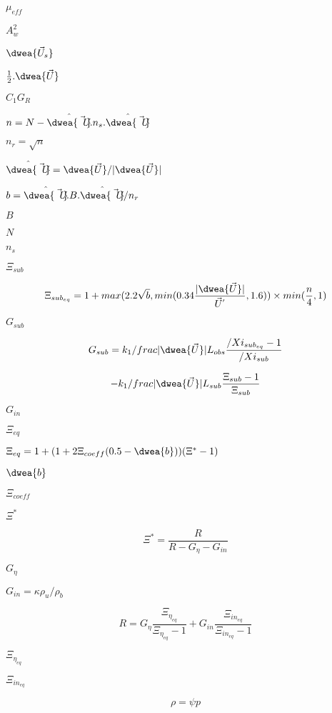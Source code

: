 \documentclass{article}
\begin{document}
$ \mu_{eff} $
\pagebreak

$ A_{w}^{2}$
\pagebreak

$ \dwea{\vec{U}_{s}} $
\pagebreak

$ \frac{1}{2}. \dwea{\vec{U}} $
\pagebreak

$ C_{1} G_{R} $
\pagebreak

$ n = N - \hat{\dwea{\vec{U}}}.n_{s}.\hat{\dwea{\vec{U}}} $
\pagebreak

$ n_{r} = \sqrt{n} $
\pagebreak

$ \hat{\dwea{\vec{U}}} = \dwea{\vec{U}} / \vert \dwea{\vec{U}} \vert $
\pagebreak

$ b = \hat{\dwea{\vec{U}}}.B.\hat{\dwea{\vec{U}}} / n_{r} $
\pagebreak

$ B $
\pagebreak

$ N $
\pagebreak

$ n_{s} $
\pagebreak

$ \Xi_{sub} $
\pagebreak

\[ \Xi_{{sub}_{eq}} = 1 + max(2.2 \sqrt{b}, min(0.34 \frac{\vert \dwea{\vec{U}} \vert}{{\vec{U}}^{'}}, 1.6)) \times min(\frac{n}{4}, 1) \]
\pagebreak

$ G_{sub} $
\pagebreak

\[ G_{sub} = k_{1} /frac{\vert \dwea{\vec{U}} \vert}{L_{obs}} \frac{/Xi_{{sub}_{eq}}-1}{/Xi_{sub}} \]
\pagebreak

\[ - k_{1} /frac{\vert \dwea{\vec{U}} \vert}{L_{sub}} \frac{\Xi_{sub}-1}{\Xi_{sub}} \]
\pagebreak

$ G_{in} $
\pagebreak

$\Xi_{eq}$
\pagebreak

$\Xi_{eq} = 1 + (1 + 2\Xi_{coeff}(0.5 - \dwea{b}))(\Xi^* - 1)$
\pagebreak

$ \dwea{b} $
\pagebreak

$ \Xi_{coeff} $
\pagebreak

$ \Xi^* $
\pagebreak

\[ \Xi^* = \frac {R}{R - G_\eta - G_{in}} \]
\pagebreak

$ G_\eta $
\pagebreak

$ G_{in} = \kappa \rho_{u}/\rho_{b} $
\pagebreak

\[ R = G_\eta \frac{\Xi_{\eta_{eq}}}{\Xi_{\eta_{eq}} - 1} + G_{in} \frac{\Xi_{{in}_{eq}}}{\Xi_{{in}_{eq}} - 1} \]
\pagebreak

$ \Xi_{\eta_{eq}} $
\pagebreak

$ \Xi_{{in}_{eq}} $
\pagebreak

\[ \rho = \psi p \]
\pagebreak
\end{document}
